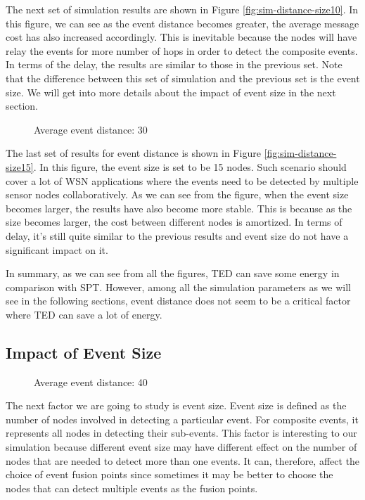 The next set of simulation results are shown in Figure \ref{fig:sim-distance-size10}. In this figure, we can see as the event distance becomes greater, the average message cost has also increased accordingly. This is inevitable because the nodes will have relay the events for more number of hops in order to detect the composite events. In terms of the delay, the results are similar to those in the previous set. Note that the difference between this set of simulation and the previous set is the event size. We will get into more details about the impact of event size in the next section. 

\begin{figure}
\centering
{}
\caption{Average event distance: 30}
\label{fig:sim-size-distance30}
\end{figure}

The last set of results for event distance is shown in Figure \ref{fig:sim-distance-size15}. In this figure, the event size is set to be 15 nodes. Such scenario should cover a lot of WSN applications where the events need to be detected by multiple sensor nodes collaboratively. As we can see from the figure, when the event size becomes larger, the results have also become more stable. This is because as the size becomes larger, the cost between different nodes is amortized. In terms of delay, it's still quite similar to the previous results and event size do not have a significant impact on it.

In summary, as we can see from all the figures, TED can save some energy in comparison with SPT. However, among all the simulation parameters as we will see in the following sections, event distance does not seem to be a critical factor where TED can save a lot of energy.

\subsection{Impact of Event Size}
\begin{figure}
\centering
{}
\caption{Average event distance: 40}
\label{fig:sim-size-distance40}
\end{figure}

The next factor we are going to study is event size. Event size is defined as the number of nodes involved in detecting a particular event. For composite events, it represents all nodes in detecting their sub-events. This factor is interesting to our simulation because different event size may have different effect on the number of nodes that are needed to detect more than one events. It can, therefore, affect the choice of event fusion points since sometimes it may be better to choose the nodes that can detect multiple events as the fusion points.

